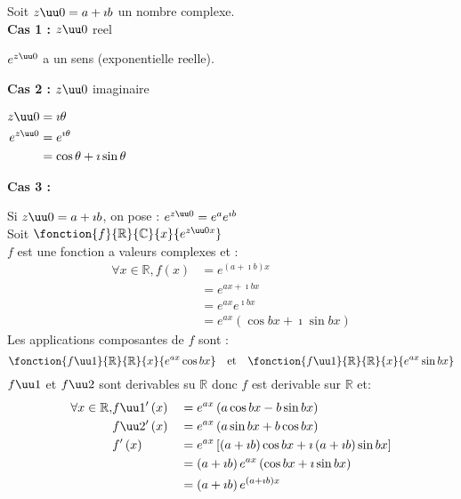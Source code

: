 \documentclass[12pt,twoside,a4paper]{article}
\begin{document}
		Soit $z\uu0=a+\imath b$ un nombre complexe.\\
		\textbf{Cas 1 :} $z\uu0$ reel
		\begin{tab}
			$e^{z\uu0}$ a un sens (exponentielle reelle).
		\end{tab}
		\textbf{Cas 2 :} $z\uu0$ imaginaire
		\begin{tab}
			$\begin{aligned}z\uu0&=\imath\theta \\
						e^{z\uu0}&=e^{\imath\theta}\\
								 &=\cos\theta+\imath\sin\theta\end{aligned}$
		\end{tab}
		\textbf{Cas 3 :}
		\begin{tab}
			Si $z\uu0=a+\imath b$, on pose : $e^{z\uu0}=e^ae^{\imath b}$ \\
			Soit $\fonction{f}{\mathbb{R}}{\mathbb{C}}{x}{e^{z\uu0x}}$ \\
			$f$ est une fonction a valeurs complexes et :
			$$\begin{aligned}
				\forall x\in\mathbb{R},f\left(x\right)&=e^{\left(a+\imath b\right)x} \\
													   &=e^{ax+\imath bx} \\
													   &=e^{ax}e^{\imath bx} \\
													   &=e^{ax}\left(\cos bx+\imath\sin bx\right)
			\end{aligned}$$
			Les applications composantes de $f$ sont :
			$$\fonction{f\uu1}{\mathbb{R}}{\mathbb{R}}{x}{e^{ax}\cos bx} \ \ \ \text{et} \ \ \ \fonction{f\uu1}{\mathbb{R}}{\mathbb{R}}{x}{e^{ax}\sin bx}$$
			$f\uu1$ et $f\uu2$ sont derivables su $\mathbb{R}$ donc $f$ est derivable sur $\mathbb{R}$ et:
			$$\begin{aligned}
				\forall x\in\mathbb{R},&f\uu1'\left(x\right)&&=e^{ax}\left(a\cos bx-b\sin bx\right) \\
										&f\uu2'\left(x\right)&&=e^{ax}\left(a\sin bx+b\cos bx\right) \\
										&f'\left(x\right)&&=e^{ax}\left[\left(a+\imath b\right)\cos bx+\imath\left(a+\imath b\right)\sin bx\right] \\
										&				 &&=\left(a+\imath b\right)e^{ax}\left(\cos bx+\imath\sin bx\right) \\
										&				 &&=\left(a+\imath b\right)e^{\left(a+\imath b\right)x}
			\end{aligned}$$
		\end{tab}
\end{document}
